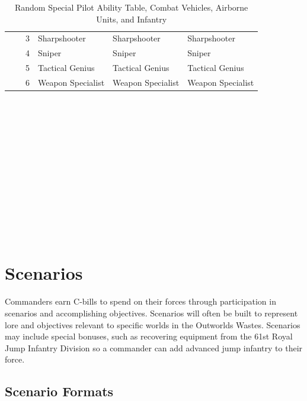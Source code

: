 \documentclass{article}
\begin{document}
\begin{itemize}
\begin{table}[h!]
\begin{tabular}{| C{4em} | C{4em} | C{4em} | m{10em} | m{10em} | m{10em} |}
      &        & 3     & Sharpshooter      & Sharpshooter      & Sharpshooter      \\
      &        & 4     & Sniper            & Sniper            & Sniper            \\
      &        & 5     & Tactical Genius   & Tactical Genius   & Tactical Genius   \\
      &        & 6     & Weapon Specialist & Weapon Specialist & Weapon Specialist \\
\hline
\end{tabular}
\caption*{Random Special Pilot Ability Table, Combat Vehicles, Airborne Units, and Infantry}
\end{table}

\end{itemize}

~\\

~\\

~\\

~\\

~\\

~\\

~\\

~\\

~\\

~\\

~\\

~\\

\newpage

\section{Scenarios}

Commanders earn C-bills to spend on their forces through participation in scenarios and accomplishing objectives.
Scenarios will often be built to represent lore and objectives relevant to specific worlds in the Outworlds Wastes.
Scenarios may include special bonuses, such as recovering equipment from the 61st Royal Jump Infantry Division so a commander can add advanced jump infantry to their force.

\subsection{Scenario Formats}
\end{document}
